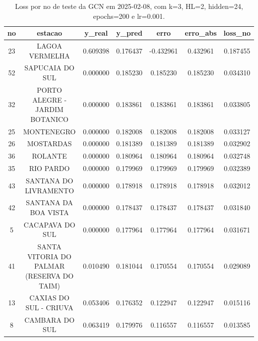 \begin{table}[h]
\centering
\caption{Loss por no de teste da GCN em 2025-02-08, com k=3, HL=2, hidden=24, epochs=200 e lr=0.001.}
\label{tab:gcn_loss_k3_hl2_h24_e200_d20250208}
\begin{tabular}{ccccccc}
\toprule
no & estacao & y\_real & y\_pred & erro & erro\_abs & loss\_no \\
\midrule
23 & LAGOA VERMELHA & 0.609398 & 0.176437 & -0.432961 & 0.432961 & 0.187455 \\
52 & SAPUCAIA DO SUL & 0.000000 & 0.185230 & 0.185230 & 0.185230 & 0.034310 \\
32 & PORTO ALEGRE - JARDIM BOTANICO & 0.000000 & 0.183861 & 0.183861 & 0.183861 & 0.033805 \\
25 & MONTENEGRO & 0.000000 & 0.182008 & 0.182008 & 0.182008 & 0.033127 \\
26 & MOSTARDAS & 0.000000 & 0.181389 & 0.181389 & 0.181389 & 0.032902 \\
36 & ROLANTE & 0.000000 & 0.180964 & 0.180964 & 0.180964 & 0.032748 \\
35 & RIO PARDO & 0.000000 & 0.179969 & 0.179969 & 0.179969 & 0.032389 \\
43 & SANTANA DO LIVRAMENTO & 0.000000 & 0.178918 & 0.178918 & 0.178918 & 0.032012 \\
42 & SANTANA DA BOA VISTA & 0.000000 & 0.178437 & 0.178437 & 0.178437 & 0.031840 \\
5 & CACAPAVA DO SUL & 0.000000 & 0.177964 & 0.177964 & 0.177964 & 0.031671 \\
41 & SANTA VITORIA DO PALMAR (RESERVA DO TAIM) & 0.010490 & 0.181044 & 0.170554 & 0.170554 & 0.029089 \\
13 & CAXIAS DO SUL - CRIUVA & 0.053406 & 0.176352 & 0.122947 & 0.122947 & 0.015116 \\
8 & CAMBARA DO SUL & 0.063419 & 0.179976 & 0.116557 & 0.116557 & 0.013585 \\
\bottomrule
\end{tabular}
\end{table}
